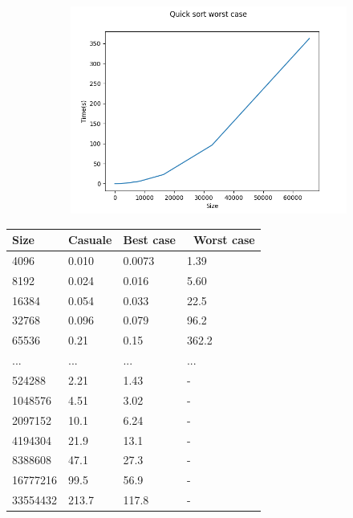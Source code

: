 \documentclass[]{article}
\begin{document}
\begin{figure}[H]
    \newpage
    \begin{subfigure}[b]{0.4\linewidth}
        \centering
        \includegraphics[width=\textwidth]{QuickSortWorstCase}
        \label{fig:quick_worst}
    \end{subfigure}
\end{figure}

\begin{table}[H]
\centering
\label{tab:quick}
\begin{tabular}{|l|l|l|l|} 
\hline
Size     & Casuale & Best case & ~Worst case  \\ 
\hline
4096     & 0.010   & 0.0073    & 1.39         \\
8192     & 0.024   & 0.016     & 5.60         \\
16384    & 0.054   & 0.033     & 22.5         \\
32768    & 0.096   & 0.079     & 96.2         \\
65536    & 0.21    & 0.15      & 362.2        \\
...      & ...     & ...       & ...          \\
524288   & 2.21    & 1.43      & -            \\
1048576  & 4.51    & 3.02      & -            \\
2097152  & 10.1    & 6.24      & -            \\
4194304  & 21.9    & 13.1      & -            \\
8388608  & 47.1    & 27.3      & -            \\
16777216 & 99.5    & 56.9      & -            \\
33554432 & 213.7   & 117.8     & -            \\
\hline
\end{tabular}
\end{table}
\end{document}
